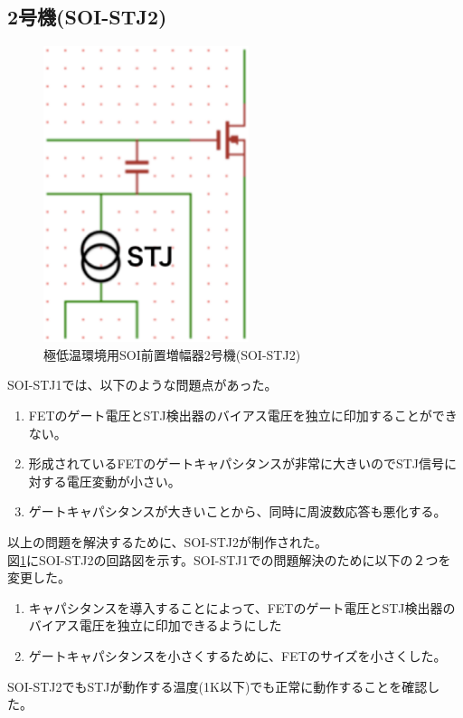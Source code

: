 	\subsection{2号機(SOI-STJ2)}
		\begin{figure}[htbp]
			\begin{center}
				\includegraphics[width=6.0cm]{./Chapter/Chapter3/Picture/SOISTJ2_circuit.eps}
				\caption{極低温環境用SOI前置増幅器2号機(SOI-STJ2)}
				\label{fig:SOISTJ2_circuit}
			\end{center}
		\end{figure}
		SOI-STJ1では、以下のような問題点があった。
		\begin{enumerate}
			\item FETのゲート電圧とSTJ検出器のバイアス電圧を独立に印加することができない。
			\item 形成されているFETのゲートキャパシタンスが非常に大きいのでSTJ信号に対する電圧変動が小さい。
			\item ゲートキャパシタンスが大きいことから、同時に周波数応答も悪化する。
		\end{enumerate}
		以上の問題を解決するために、SOI-STJ2が制作された。\\
		図\ref{fig:SOISTJ2_circuit}にSOI-STJ2の回路図を示す。SOI-STJ1での問題解決のために以下の２つを変更した。
		\begin{enumerate}
			\item キャパシタンスを導入することによって、FETのゲート電圧とSTJ検出器のバイアス電圧を独立に印加できるようにした
			\item ゲートキャパシタンスを小さくするために、FETのサイズを小さくした。
		\end{enumerate}
		SOI-STJ2でもSTJが動作する温度(1K以下)でも正常に動作することを確認した。
